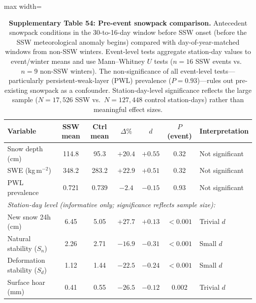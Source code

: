 \documentclass[11pt,letterpaper]{article}
\begin{document}
\begin{table}[!ht]
\centering
\caption{\textbf{Supplementary Table 54: Pre-event snowpack comparison.}
Antecedent snowpack conditions in the 30-to-16-day window before SSW onset (before the SSW meteorological anomaly begins) compared with day-of-year-matched windows from non-SSW winters. Event-level tests aggregate station-day values to event/winter means and use Mann--Whitney $U$ tests ($n = 16$ SSW events vs.\ $n = 9$ non-SSW winters). The non-significance of all event-level tests---particularly persistent-weak-layer (PWL) prevalence ($P = 0.93$)---rules out pre-existing snowpack as a confounder. Station-day-level significance reflects the large sample ($N = 17{,}526$ SSW vs.\ $N = 127{,}448$ control station-days) rather than meaningful effect sizes.}
\label{tab:pre_event_snowpack}
\small
\begin{adjustbox}{max width=\textwidth}
\begin{tabular}{lcccccl}
\toprule
\textbf{Variable} & \textbf{SSW mean} & \textbf{Ctrl mean} & \textbf{$\Delta\%$} & \textbf{$d$} & \textbf{$P$ (event)} & \textbf{Interpretation} \\
\midrule
Snow depth (cm) & 114.8 & 95.3 & $+20.4$ & $+0.55$ & 0.32 & Not significant \\
SWE (kg\,m$^{-2}$) & 348.2 & 283.2 & $+22.9$ & $+0.51$ & 0.32 & Not significant \\
PWL prevalence & 0.721 & 0.739 & $-2.4$ & $-0.15$ & 0.93 & Not significant \\
\midrule
\multicolumn{7}{l}{\textit{Station-day level (informative only; significance reflects sample size):}} \\
New snow 24h (cm) & 6.45 & 5.05 & $+27.7$ & $+0.13$ & $< 0.001$ & Trivial $d$ \\
Natural stability ($S_n$) & 2.26 & 2.71 & $-16.9$ & $-0.31$ & $< 0.001$ & Small $d$ \\
Deformation stability ($S_d$) & 1.12 & 1.44 & $-22.5$ & $-0.24$ & $< 0.001$ & Small $d$ \\
Surface hoar (mm) & 0.41 & 0.55 & $-26.5$ & $-0.12$ & 0.002 & Trivial $d$ \\
\bottomrule
\end{tabular}
\end{adjustbox}
\end{table}
\end{document}
